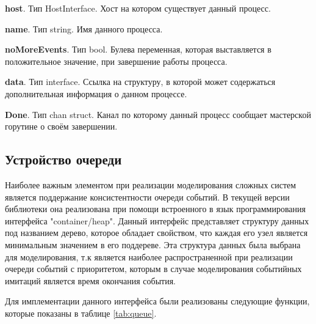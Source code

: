 \textbf{	host}. Тип       HostInterface. Хост на котором существует данный процесс. 

\textbf{	name}. Тип         string. Имя данного процесса. 

\textbf{	noMoreEvents}. Тип bool. Булева переменная, которая выставляется в положительное значение, при завершение работы процесса.

\textbf{	data}. Тип         interface. Ссылка на  структуру, в  которой может содержаться дополнительная информация о данном процессе.

\textbf{	Done}. Тип chan struct. Канал по которому данный процесс сообщает мастерской горутине о своём завершении. 

\subsection{Устройство очереди}

Наиболее важным элементом при реализации моделирования сложных систем является поддержание консистентности очереди событий. В текущей версии библиотеки она реализована при помощи встроенного в язык программирования интерфейса "container/heap". Данный интерфейс представляет структуру данных под названием дерево, которое обладает свойством, что каждая его узел является минимальным значением в его поддереве. Эта структура данных была выбрана для моделирования, т.к является наиболее распространенной при реализации очереди событий с приоритетом, которым в случае моделирования событийных имитаций является время окончания события. 

Для имплементации данного интерфейса были реализованы следующие функции, которые показаны в таблице \ref{tab:queue}. 

